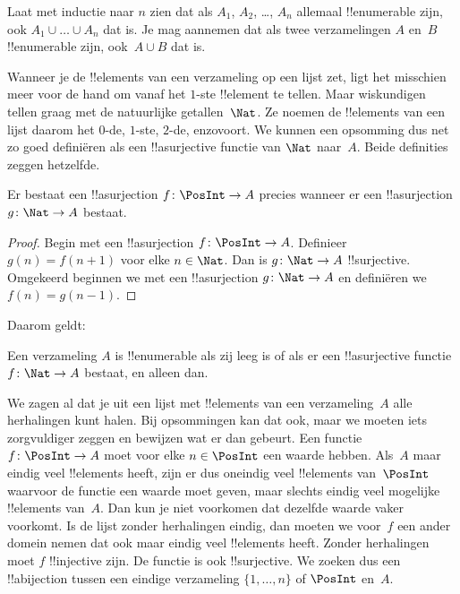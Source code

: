 \documentclass[../../../include/open-logic-section]{subfiles}
\begin{document}
\begin{prob}
  Laat met inductie naar $n$ zien dat als $A_1$, $A_2$, \dots, $A_n$
  allemaal !!{enumerable} zijn, ook $A_1 \cup \dots \cup A_n$ dat is.
  Je mag aannemen dat als twee verzamelingen $A$ en~$B$ !!{enumerable}
  zijn, ook~$A \cup B$ dat is. 
\end{prob}

Wanneer je de !!{element}s van een verzameling op een lijst zet, ligt
het misschien meer voor de hand om vanaf het $1$-ste !!{element} te
tellen. Maar wiskundigen tellen graag met de natuurlijke getallen~$\Nat$.
Ze noemen de !!{element}s van een lijst daarom het $0$-de, $1$-ste,
$2$-de, enzovoort. We kunnen een opsomming dus net
zo goed definiëren als een !!a{surjective} functie van $\Nat$ naar~$A$.
Beide definities zeggen hetzelfde.

\begin{prop}
  Er bestaat een !!a{surjection} $f\colon \PosInt \to A$ precies
  wanneer er een !!a{surjection} $g\colon \Nat \to A$ bestaat.
\end{prop}

\begin{proof}
  Begin met een !!a{surjection} $f\colon \PosInt \to A$. Definieer
  $g(n) = f(n+1)$ voor elke $n \in \Nat$. Dan is $g\colon \Nat \to A$
  !!{surjective}. Omgekeerd beginnen we met een !!a{surjection}
  $g\colon \Nat \to A$ en definiëren we $f(n) = g(n-1)$.
\end{proof}

Daarom geldt:

\begin{cor}
Een verzameling $A$ is !!{enumerable} als zij leeg is of als er een
!!a{surjective} functie $f\colon \Nat \to A$ bestaat, en alleen dan.
\end{cor}

We zagen al dat je uit een lijst met !!{element}s van een
verzameling~$A$ alle herhalingen kunt halen. Bij opsommingen kan dat
ook, maar we moeten iets zorgvuldiger zeggen en bewijzen wat er dan
gebeurt. Een functie $f\colon \PosInt \to A$ moet voor elke
$n \in \PosInt$ een waarde hebben. Als~$A$ maar eindig veel
!!{element}s heeft, zijn er dus oneindig veel !!{element}s van~$\PosInt$
waarvoor de functie een waarde moet geven, maar slechts eindig veel
mogelijke !!{element}s van~$A$. Dan kun je niet voorkomen dat dezelfde
waarde vaker voorkomt. Is de lijst zonder herhalingen eindig, dan
moeten we voor~$f$ een ander domein nemen dat ook maar eindig veel
!!{element}s heeft. Zonder herhalingen moet $f$ !!{injective} zijn.
De functie is ook !!{surjective}. We zoeken dus een !!a{bijection}
tussen een eindige verzameling $\{1, \dots, n\}$ of $\PosInt$ en~$A$.
\end{document}
